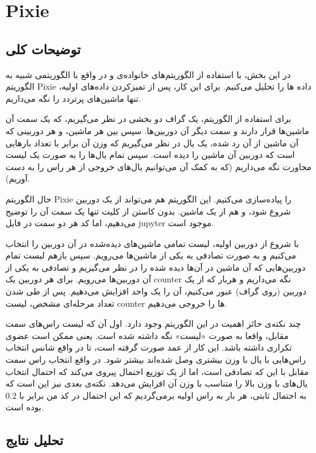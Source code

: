 \section{Pixie}

\subsection{توضیحات کلی}

در این بخش، با استفاده از الگوریتم‌های خانواده‌ی 
و در واقع با الگوریتمی شبیه به الگوریتم 
Pixie 
داده‌ ها را تحلیل می‌کنیم. برای این کار، پس از تمیز‌کردن داده‌های اولیه، تنها 
ماشین‌های پرتردد را نگه می‌داریم. 

برای استفاده از الگوریتم، یک گراف دو بخشی در نظر می‌گیریم، که یک سمت‌ آن 
ماشین‌ها قرار دارند و سمت دیگر آن دوربین‌ها. سپس بین هر ماشین، و هر دوربینی 
که آن ماشین از آن رد شده، یک یال در نظر می‌گیریم که وزن آن برابر با تعداد 
بار‌هایی است که دوربین آن ماشین را دیده است. سپس تمام یال‌ها را به صورت یک لیست مجاورت نگه می‌داریم (که به کمک 
آن می‌توانیم یال‌های خروجی از هر راس را به دست آوریم). 

حال الگوریتم 
Pixie
را پیاده‌سازی می‌کنیم. این الگوریتم هم می‌تواند از یک دوربین شروع شود، و هم از یک ماشین. بدون کاستن از کلیت تنها یک سمت آن را توضیح می‌دهیم، اما کد هر دو سمت در فایل
jupyter
موجود است.

با شروع از دوربین اولیه، لیست تمامی ماشین‌های دیده‌شده 
در آن دوربین را انتخاب می‌کنیم و به صورت تصادفی به یکی از ماشین‌ها می‌رویم. سپس 
باز‌هم لیست تمام دوربین‌هایی که آن ماشین در آن‌ها دیده شده را در نظر می‌گیریم و 
تصادفی به یکی از آن دوربین‌ها می‌رویم. برای هر دوربین یک 
counter
نگه می‌داریم و هربار که از یک دوربین (روی گراف) عبور می‌کنیم، آن را یک واحد 
افزایش می‌دهیم. پس از طی شدن تعداد مرحله‌ای مشخص، لیست 
counter
ها را خروجی می‌دهیم. 

چند نکته‌ی حائز اهمیت در این الگوریتم وجود دارد. اول آن که 
لیست راس‌های سمت مقابل، واقعا به صورت «لیست» نگه داشته شده است. یعنی 
ممکن است عضوی تکراری داشته باشد. این کار از عمد صورت گرفته است، 
تا در واقع شانس انتخاب راس‌هایی با یال با وزن بیشتری وصل شده‌اند بیشتر شود. 
در واقع انتخاب راس سمت مقابل با این که تصادفی است، اما از یک توزیع احتمال پیروی 
می‌کند که احتمال انتخاب یال‌های با وزن بالا را متناسب با وزن آن 
افزایش می‌دهد. نکته‌ی بعدی نیز این است که به احتمال ثابتی، هر بار به راس 
اولیه برمی‌گردیم که این احتمال در کد من برابر با 
$0.2$
بوده است. 


\subsection{تحلیل نتایج}

